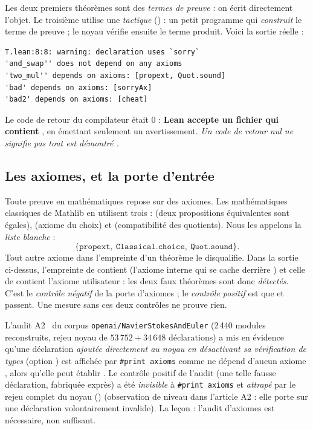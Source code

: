 Les deux premiers théorèmes sont des \emph{termes de preuve} : on écrit directement l'objet. Le troisième utilise une \emph{tactique} () :
un petit programme qui \emph{construit} le terme de preuve ; le noyau vérifie ensuite le terme produit. Voici la sortie réelle :

\begin{lstlisting}[language={}]
T.lean:8:8: warning: declaration uses `sorry`
'and_swap'' does not depend on any axioms
'two_mul'' depends on axioms: [propext, Quot.sound]
'bad' depends on axioms: [sorryAx]
'bad2' depends on axioms: [cheat]
\end{lstlisting}

Le code de retour du compilateur était $0$ : \textbf{Lean accepte un fichier qui contient }, en émettant seulement un avertissement.
\emph{Un code de retour nul ne signifie pas \og tout est démontré \fg{}.}

\subsection{Les axiomes, et la porte d'entrée}

Toute preuve en mathématiques repose sur des axiomes. Les mathématiques classiques de Mathlib en utilisent trois :  (deux propositions
équivalentes sont égales),  (axiome du choix) et  (compatibilité des quotients). Nous les appelons la \emph{liste blanche} :
\[
  \{\texttt{propext},\ \texttt{Classical.choice},\ \texttt{Quot.sound}\}.
\]
Tout autre axiome dans l'empreinte d'un théorème le disqualifie. Dans la sortie ci-dessus, l'empreinte de  contient  (l'axiome interne qui
se cache derrière ) et celle de  contient l'axiome utilisateur  : les deux faux théorèmes sont donc \emph{détectés}.
C'est le \emph{contrôle négatif} de la porte d'axiomes ; le \emph{contrôle positif} est que  et  passent. Une mesure sans ces deux contrôles ne prouve rien.

\begin{warnbox}
L'audit A2~\cite{a2} du corpus \texttt{openai/NavierStokesAndEuler} (2\,440 modules reconstruits, rejeu noyau de $53\,752+34\,648$ déclarations) a mis en évidence qu'une déclaration
\emph{ajoutée directement au noyau en désactivant sa vérification de types} (option ) est affichée par \texttt{\#print axioms} comme
\og ne dépend d'aucun axiome \fg{}, alors qu'elle peut établir . Le contrôle positif de l'audit (une telle fausse déclaration, fabriquée exprès) a été
\emph{invisible} à \texttt{\#print axioms} et \emph{attrapé} par le rejeu complet du noyau () (observation de niveau \tierX{} dans l'article A2 : elle porte sur une déclaration volontairement invalide). La leçon : l'audit d'axiomes est nécessaire,
non suffisant.
\end{warnbox}

